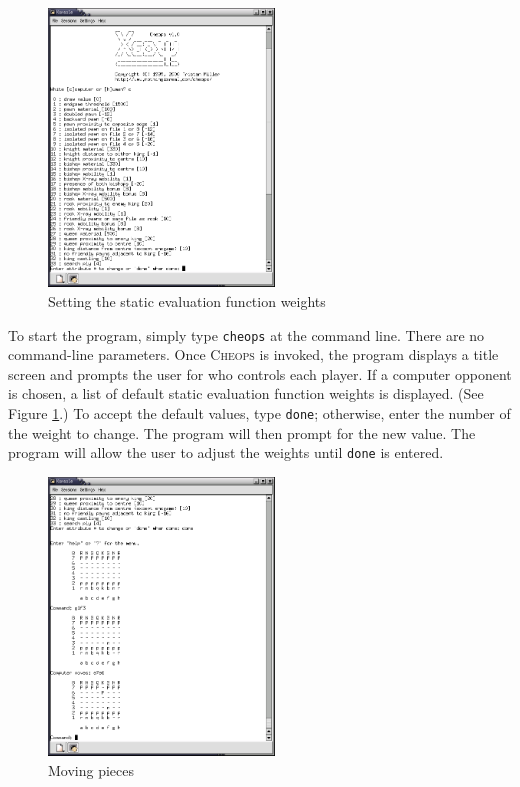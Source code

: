 \documentclass[12pt]{article}
\begin{document}
\begin{figure}[htbp]
  \begin{center}
    \includegraphics[width=6cm]{cheops1.png}
    \caption{Setting the static evaluation function weights}
    \label{fig:weights}
  \end{center}
\end{figure}

To start the program, simply type \texttt{cheops} at the command line.
There are no command-line parameters. Once \textsc{Cheops} is invoked,
the program displays a title screen and prompts the user for who
controls each player. If a computer opponent is chosen, a list of
default static evaluation function weights is displayed. (See Figure
\ref{fig:weights}.)  To accept the default values, type \texttt{done};
otherwise, enter the number of the weight to change. The program will
then prompt for the new value. The program will allow the user to
adjust the weights until \texttt{done} is entered.

\begin{figure}[t]
  \begin{center}
    \includegraphics[width=6cm]{cheops2.png}
    \caption{Moving pieces}
    \label{fig:move}
  \end{center}
\end{figure}
\end{document}
